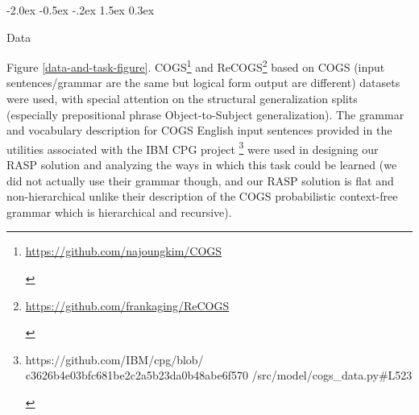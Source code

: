 \documentclass[11pt]{article}
\makeatletter
\renewcommand\section{\@startsection{section}{1}{\z@}%
                                  {-2.0ex \@plus -0.5ex \@minus -.2ex}%
                                  {1.5ex \@plus 0.3ex}%
                                  {\large\bfseries\raggedright}}
\makeatother
\begin{document}
\section{Data}

Figure \ref{data-and-task-figure}.
COGS\footnote{\begin{footnotesize}\href{https://github.com/najoungkim/COGS}{https://github.com/najoungkim/COGS}\end{footnotesize}} \citep{KimLinzen2020} and ReCOGS\footnote{\begin{footnotesize}\href{https://github.com/frankaging/ReCOGS}{https://github.com/frankaging/ReCOGS}\end{footnotesize}} \citep{Wu2023} based on COGS \citep{KimLinzen2020} (input sentences/grammar are the same but logical form output are different) datasets were used, with special attention on the structural generalization splits (especially prepositional phrase Object-to-Subject generalization). The grammar and vocabulary description for COGS English input sentences provided in the utilities associated with the IBM CPG project \citep{klinger2024compositionalprogramgenerationfewshot}\footnote{\begin{footnotesize}https://github.com/IBM/cpg/blob/
c3626b4e03bfc681be2c2a5b23da0b48abe6f570
/src/model/cogs\_data.py\#L523
\end{footnotesize}}
were used in designing our RASP solution and analyzing the ways in which this task could be learned (we did not actually use their grammar though, and our RASP solution is flat and non-hierarchical unlike their description of the COGS probabilistic context-free grammar which is hierarchical and recursive).
\end{document}
